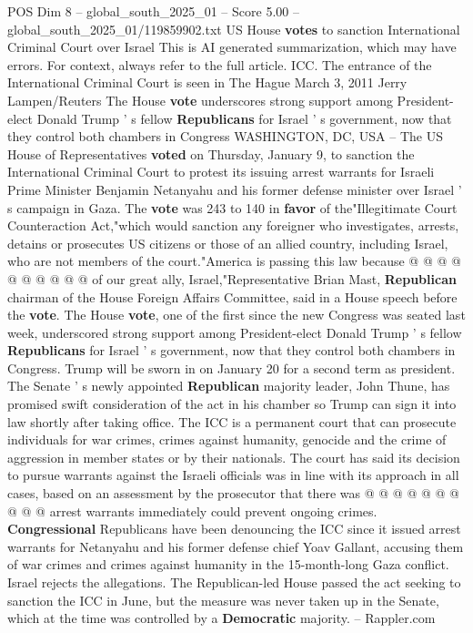 \begin{textsample}{POS Dim 8 – global\_south\_2025\_01 – Score 5.00 – global\_south\_2025\_01/119859902.txt}  \label{ex:f8_pos_325}
US House \textbf{votes} to sanction International Criminal Court over Israel This is AI generated summarization, which may have errors.
For context, always refer to the full article.
ICC.
The entrance of the International Criminal Court is seen in The Hague March 3, 2011 Jerry Lampen/Reuters The House \textbf{vote} underscores strong support among President-elect Donald Trump ' s fellow \textbf{Republicans} for Israel ' s government, now that they control both chambers in Congress WASHINGTON, DC, USA -- The US House of Representatives \textbf{voted} on Thursday, January 9, to sanction the International Criminal Court to protest its issuing arrest warrants for Israeli Prime Minister Benjamin Netanyahu and his former defense minister over Israel ' s campaign in Gaza.
The \textbf{vote} was 243 to 140 in \textbf{favor} of the"Illegitimate Court Counteraction Act,"which would sanction any foreigner who investigates, arrests, detains or prosecutes US citizens or those of an allied country, including Israel, who are not members of the court."America is passing this law because @ @ @ @ @ @ @ @ @ @ of our great ally, Israel,"Representative Brian Mast, \textbf{Republican} chairman of the House Foreign Affairs Committee, said in a House speech before the \textbf{vote}.
The House \textbf{vote}, one of the first since the new Congress was seated last week, underscored strong support among President-elect Donald Trump ' s fellow \textbf{Republicans} for Israel ' s government, now that they control both chambers in Congress.
Trump will be sworn in on January 20 for a second term as president.
The Senate ' s newly appointed \textbf{Republican} majority leader, John Thune, has promised swift consideration of the act in his chamber so Trump can sign it into law shortly after taking office.
The ICC is a permanent court that can prosecute individuals for war crimes, crimes against humanity, genocide and the crime of aggression in member states or by their nationals.
The court has said its decision to pursue warrants against the Israeli officials was in line with its approach in all cases, based on an assessment by the prosecutor that there was @ @ @ @ @ @ @ @ @ @ arrest warrants immediately could prevent ongoing crimes. \textbf{Congressional} Republicans have been denouncing the ICC since it issued arrest warrants for Netanyahu and his former defense chief Yoav Gallant, accusing them of war crimes and crimes against humanity in the 15-month-long Gaza conflict.
Israel rejects the allegations.
The Republican-led House passed the act seeking to sanction the ICC in June, but the measure was never taken up in the Senate, which at the time was controlled by a \textbf{Democratic} majority. -- Rappler.com

\end{textsample}
